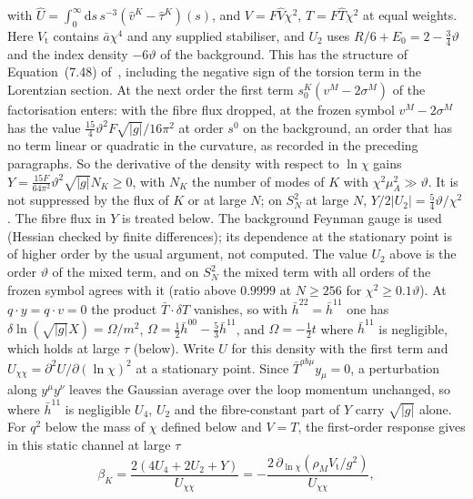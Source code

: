 with \(\hat U=\int_0^\infty\mathrm ds\,s^{-3}(\hat v^K-\hat\tau^K)(s)\), and \(V=F\hat V\chi^2\), \(T=F\hat T\chi^2\) at equal weights. Here \(V_{\mathrm t}\) contains \(\bar a\chi^4\) and any supplied stabiliser, and \(U_2\) uses \(R/6+E_0=2-\tfrac34\vartheta\) and the index density \(-6\vartheta\) of the background. This has the structure of Equation~(7.48) of~\cite{Steinacker2023}, including the negative sign of the torsion term in the Lorentzian section. At the next order the first term \(s_0^K(v^M-2\sigma^M)\) of the factorisation enters: with the fibre flux dropped, at the frozen symbol \(v^M-2\sigma^M\) has the value \(\tfrac{15}{4}\vartheta^2F\sqrt{|g|}/16\pi^2\) at order \(s^0\) on the background, an order that has no term linear or quadratic in the curvature, as recorded in the preceding paragraphs. So the derivative of the density with respect to \(\ln\chi\) gains \(Y=\tfrac{15F}{64\pi^2}\vartheta^2\sqrt{|g|}N_K\ge0\), with \(N_K\) the number of modes of \(K\) with \(\chi^2\mu_A^2\gg\vartheta\). It is not suppressed by the flux of \(K\) or at large \(N\); on \(S^2_N\) at large \(N\), \(Y/2|U_2|=\tfrac54\vartheta/\chi^2\). The fibre flux in \(Y\) is treated below. The background Feynman gauge is used (Hessian checked by finite differences); its dependence at the stationary point is of higher order by the usual argument, not computed. The value \(U_2\) above is the order \(\vartheta\) of the mixed term, and on \(S^2_N\) the mixed term with all orders of the frozen symbol agrees with it (ratio above \(0.9999\) at \(N\ge256\) for \(\chi^2\ge0.1\vartheta\)). At \(q\cdot y=q\cdot v=0\) the product \(\bar T\cdot\delta T\) vanishes, so with \(\bar h^{22}=\bar h^{11}\) one has \(\delta\ln(\sqrt{|g|}X)=\Omega/m^2\), \(\Omega=\tfrac12\bar h^{00}-\tfrac53\bar h^{11}\), and \(\Omega=-\tfrac12t\) where \(\bar h^{11}\) is negligible, which holds at large \(\tau\) (below). Write \(U\) for this density with the first term and \(U_{\chi\chi}=\partial^2U/\partial(\ln\chi)^2\) at a stationary point. Since \(\bar T^{ab\mu}y_\mu=0\), a perturbation along \(y^\mu y^\nu\) leaves the Gaussian average over the loop momentum unchanged, so where \(\bar h^{11}\) is negligible \(U_4\), \(U_2\) and the fibre-constant part of \(Y\) carry \(\sqrt{|g|}\) alone. For \(q^2\) below the mass of \(\chi\) defined below and \(V=T\), the first-order response gives in this static channel at large \(\tau\)
\[
\beta_K=\frac{2(4U_4+2U_2+Y)}{U_{\chi\chi}}=-\frac{2\,\partial_{\ln\chi}(\rho_MV_{\mathrm t}/g^2)}{U_{\chi\chi}},
\]
